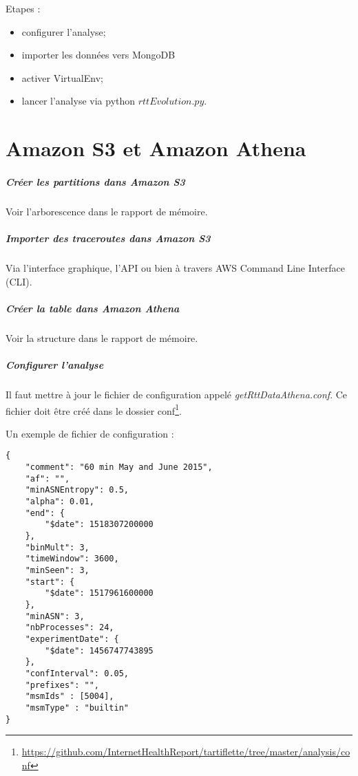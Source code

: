 \documentclass[]{report}
\begin{document}
Etapes : 
\begin{itemize}
	\item configurer l'analyse;
	\item importer les données vers MongoDB
	\item activer VirtualEnv;
	\item lancer l'analyse via python $ rttEvolution.py $.  
\end{itemize}

\chapter*{Amazon S3 et Amazon Athena}



\paragraph{Créer les partitions dans Amazon S3}
Voir l'arborescence dans le rapport de mémoire.
\paragraph{Importer des traceroutes dans Amazon S3} Via l'interface graphique, l'API ou bien à travers AWS Command Line Interface (CLI).

\paragraph{Créer la table dans Amazon Athena}
Voir la structure dans le rapport de mémoire.
\paragraph{Configurer l'analyse}
Il faut mettre à jour le fichier de configuration appelé \textit{getRttDataAthena.conf}. Ce fichier doit être créé dans le dossier conf\footnote{\url{https://github.com/InternetHealthReport/tartiflette/tree/master/analysis/conf}}.

Un exemple de fichier de configuration :
\begin{lstlisting}
{
	"comment": "60 min May and June 2015", 
	"af": "", 
	"minASNEntropy": 0.5, 
	"alpha": 0.01, 
	"end": {
		"$date": 1518307200000
	}, 
	"binMult": 3, 
	"timeWindow": 3600, 
	"minSeen": 3, 
	"start": {
		"$date": 1517961600000
	}, 
	"minASN": 3, 
	"nbProcesses": 24, 
	"experimentDate": {
		"$date": 1456747743895
	}, 
	"confInterval": 0.05,
	"prefixes": "",
	"msmIds" : [5004],
	"msmType" : "builtin"
}
\end{lstlisting}
\end{document}
